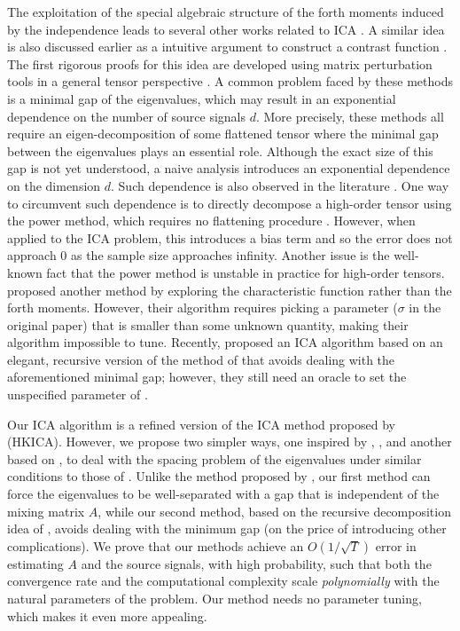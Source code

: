 \documentclass[twoside,11pt]{article}
\begin{document}
The exploitation of the special algebraic structure of the forth moments induced by the independence leads to several other works related to ICA \citep{hsu2013learning,anandkumar2012tensordecomposition,anandkumar2012method}. 
A similar idea is also discussed earlier as a intuitive argument to construct a contrast function \citep{cardoso1999high}. 
The first rigorous proofs for this idea are developed using matrix perturbation tools in a general tensor perspective \citep{anandkumar2012tensordecomposition,anandkumar2012method,goyal2014fourier}. 
A common problem faced by these methods is a minimal gap of the eigenvalues, which may result in an exponential dependence on the number of source signals $d$.
More precisely, these methods all require an eigen-decomposition of some flattened tensor where the minimal gap between the eigenvalues plays an essential role. 
Although the exact size of this gap is not yet understood, a naive analysis introduces an exponential dependence on the dimension $d$. 
Such dependence is also observed in the literature \citep{cardoso1999high,goyal2014fourier}.
One way to circumvent such dependence is to directly decompose a high-order tensor using the power method, which requires no flattening procedure \citep{anandkumar2014guaranteed}. 
However, when applied to the ICA problem, this introduces a bias term and so the error does not approach 0 as the sample size approaches infinity.
Another issue is the well-known fact that the power method is unstable in practice for high-order tensors. 
\citet{goyal2014fourier} proposed another method by exploring the characteristic function rather than the forth moments.
However, their algorithm requires picking a parameter ($\sigma$ in the original paper) that is smaller than some unknown quantity, making their algorithm impossible to tune.
Recently, \citet{vempala2014max} proposed an ICA algorithm based on an elegant, recursive version of the method of \citet{goyal2014fourier} that avoids dealing with the aforementioned minimal gap; however, they still need an oracle to set the unspecified parameter of \citet{goyal2014fourier}.

Our ICA algorithm is a refined version of the ICA method proposed by \cite{hsu2013learning} (HKICA). 
However, we propose two simpler ways, one inspired by \citet{frieze1996learning}, \citet{arora2012provable}, and another based on \citet{vempala2014max}, to deal with the spacing problem of the eigenvalues under similar conditions to those of \citet{goyal2014fourier}.
Unlike the method proposed by \citet{goyal2014fourier}, our first method can force the eigenvalues to be well-separated with a gap that is independent of the mixing matrix $A$, while our second method, based on the recursive decomposition idea of \citet{vempala2014max}, avoids dealing with the minimum gap (on the price of introducing other complications).
We prove that our methods achieve an $O(1/\sqrt{T})$ error in estimating $A$ and the source signals, with high probability, such that both the convergence rate and the computational complexity scale \emph{polynomially} with the natural parameters of the problem. 
Our method needs no parameter tuning, which makes it even more appealing. 
\end{document}
